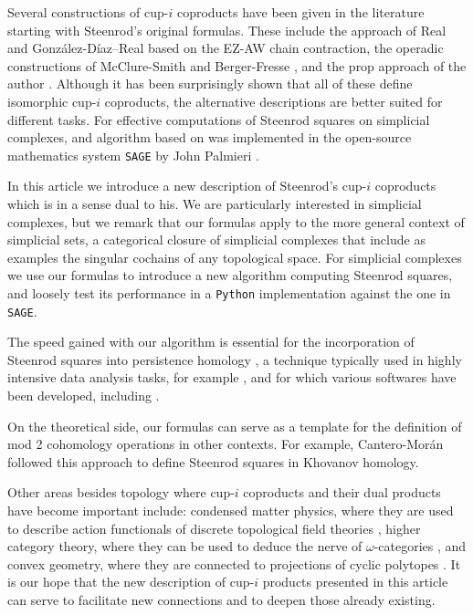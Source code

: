 Several constructions of cup-$i$ coproducts have been given in the literature starting with Steenrod's original formulas.
These include the approach of Real \cite{real1996computability} and Gonz\'alez-D\'iaz--Real \cite{gonzalez1999combinatorial, gonzalez2003computation, gonzalez2005hpt} based on the EZ-AW chain contraction, the operadic constructions of McClure-Smith \cite{mcclure03cochain} and Berger-Fresse \cite{berger04combinatorial}, and the prop approach of the author \cite{medina2020prop1, medina2018prop2}.
Although it has been surprisingly shown \cite{medina2018axiomatic} that all of these define isomorphic cup-$i$ coproducts, the alternative descriptions are better suited for different tasks.
For effective computations of Steenrod squares on simplicial complexes, and algorithm based on \cite{gonzalez1999combinatorial} was implemented in the open-source mathematics system \verb|SAGE| by John Palmieri \cite{sagemath}.

In this article we introduce a new description of Steenrod's cup-$i$ coproducts which is in a sense dual to his.
We are particularly interested in simplicial complexes, but we remark that our formulas apply to the more general context of simplicial sets, a categorical closure of simplicial complexes that include as examples the singular cochains of any topological space.
For simplicial complexes we use our formulas to introduce a new algorithm computing Steenrod squares, and loosely test its performance in a \verb|Python| implementation against the one in \verb|SAGE|.

The speed gained with our algorithm is essential for the incorporation of Steenrod squares into persistence homology \cite{medina2018persistence}, a technique typically used in highly intensive data analysis tasks, for example \cite{carlsson2008images, carlsson2013viral, lee2018nanoporous}, and for which various softwares have been developed, including \cite{bauer2019ripser, gudhi, medina2020giottotda}.

On the theoretical side, our formulas can serve as a template for the definition of mod 2 cohomology operations in other contexts.
For example, Cantero-Mor\'an \cite{cantero2020khovanov} followed this approach to define Steenrod squares in Khovanov homology.

Other areas besides topology where cup-$i$ coproducts and their dual products have become important include: condensed matter physics, where they are used to describe action functionals of discrete topological field theories \cite{gaiotto2016spin, bhardwaj2017state, kapustin2017fermionic}, higher category theory, where they can be used to deduce the nerve of $\omega$-categories \cite{medina2020globular}, and convex geometry, where they are connected to projections of cyclic polytopes \cite{kapranov1991combinatorial}.
It is our hope that the new description of cup-$i$ products presented in this article can serve to facilitate new connections and to deepen those already existing.

